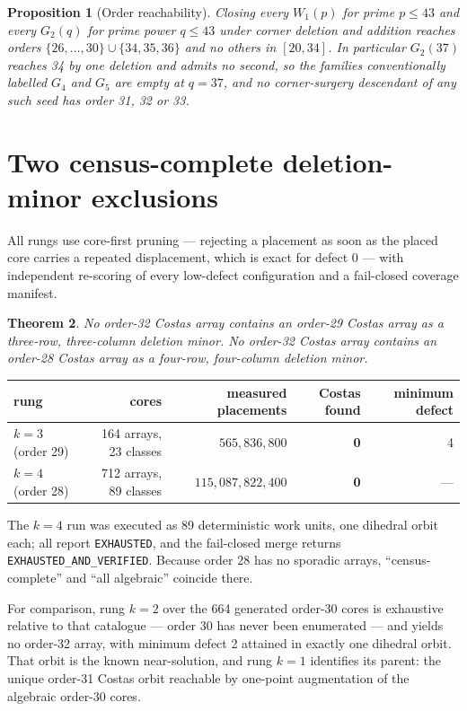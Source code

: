 \documentclass[11pt,a4paper]{article}
\newtheorem{theorem}{Theorem}[section]
\newtheorem{proposition}[theorem]{Proposition}
\theoremstyle{definition}
\theoremstyle{remark}
\begin{document}
\begin{proposition}[Order reachability]\label{prop:reach}
Closing every $W_1(p)$ for prime $p\le43$ and every $G_2(q)$ for prime power
$q\le43$ under corner deletion and addition reaches orders
$\{26,\dots,30\}\cup\{34,35,36\}$ and no others in $[20,34]$. In particular
$G_2(37)$ reaches 34 by one deletion and admits no second, so the families
conventionally labelled $G_4$ and $G_5$ are empty at $q=37$, and no corner-surgery
descendant of any such seed has order 31, 32 or 33.
\end{proposition}

\section{Two census-complete deletion-minor exclusions}
\label{sec:ladder}

All rungs use core-first pruning --- rejecting a placement as soon as the placed
core carries a repeated displacement, which is exact for defect 0 --- with
independent re-scoring of every low-defect configuration and a fail-closed
coverage manifest.

\begin{theorem}\label{thm:main}
No order-32 Costas array contains an order-29 Costas array as a three-row,
three-column deletion minor. No order-32 Costas array contains an order-28 Costas
array as a four-row, four-column deletion minor.
\end{theorem}

\begin{center}
\begin{tabular}{@{}lrrrr@{}}
\toprule
rung & cores & measured placements & Costas found & minimum defect \\
\midrule
$k=3$ (order 29) & 164 arrays, 23 classes & $565{,}836{,}800$ & \textbf{0} & 4 \\
$k=4$ (order 28) & 712 arrays, 89 classes & $115{,}087{,}822{,}400$ & \textbf{0} & --- \\
\bottomrule
\end{tabular}
\end{center}

The $k=4$ run was executed as 89 deterministic work units, one dihedral orbit
each; all report \texttt{EXHAUSTED}, and the fail-closed merge returns
\texttt{EXHAUSTED\_AND\_VERIFIED}. Because order 28 has no sporadic arrays,
``census-complete'' and ``all algebraic'' coincide there.

For comparison, rung $k=2$ over the 664 generated order-30 cores is exhaustive
relative to that catalogue --- order 30 has never been enumerated --- and yields
no order-32 array, with minimum defect 2 attained in exactly one dihedral orbit.
That orbit is the known near-solution, and rung $k=1$ identifies its parent: the
unique order-31 Costas orbit reachable by one-point augmentation of the algebraic
order-30 cores.
\end{document}
